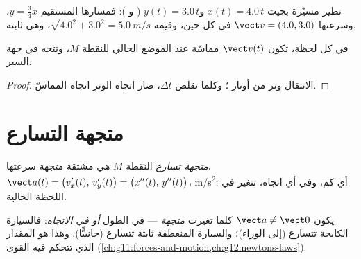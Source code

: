 \begin{example}\label{ex:g12:kinematics-2d:drone}
تطير مسيّرة بحيث $x(t) = 4.0\,t$ و$y(t) = 3.0\,t$ ( و
): فمسارها المستقيم $y = \tfrac34 x$، وسرعتها
$\vect v = (4.0, 3.0)$ في كل حين، وقيمة 
$\sqrt{4.0^2 + 3.0^2} = \qty{5.0}{m/s}$، وهي ثابتة.
\end{example}

\begin{proposition}\label{prop:g12:kinematics-2d:tangent}
في كل لحظة، تكون $\vect v(t)$ مماسّة  عند
الموضع الحالي للنقطة $M$، وتتجه في جهة السير.
\end{proposition}

\begin{proof}
الانتقال وتر من أوتار ؛ وكلما تقلص $\Delta t$،
صار اتجاه الوتر اتجاه المماسّ.
\end{proof}

\section{متجهة التسارع}

\begin{definition}\label{def:g12:kinematics-2d:acceleration}
\emph{متجهة تسارع} النقطة $M$ هي
مشتقة متجهة سرعتها،
$\vect a(t) = \bigl(v_x'(t),\, v_y'(t)\bigr) =
\bigl(x''(t),\, y''(t)\bigr)$،  \unit{m/s^2}: أي كم، وفي
أي اتجاه، تتغير  في اللحظة الحالية.
\end{definition}

\begin{remark}\label{rem:g12:kinematics-2d:turning}
يكون $\vect a \neq \vect 0$ كلما تغيرت \emph{متجهة} 
--- في الطول \emph{أو في الاتجاه}: فالسيارة الكابحة تتسارع
(إلى الوراء)؛ والسيارة المنعطفة  ثابتة تتسارع (جانبيًّا).
وهذا هو المقدار الذي تتحكم فيه القوى
(\cref{ch:g11:forces-and-motion,ch:g12:newtons-laws}).
\end{remark}

